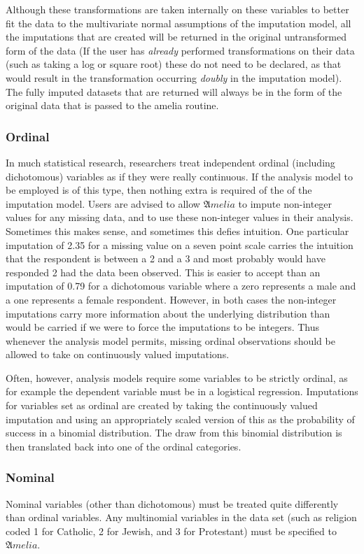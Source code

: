 \documentclass[12pt,titlepage]{article}
\begin{document}
Although these transformations are taken internally on these variables
to better fit the data to the multivariate normal assumptions of the
imputation model, all the imputations that are created will be
returned in the original untransformed form of the data (If the user has \emph{already} performed transformations on their data (such as taking a log or square root) these do not need to be declared, as that would result in the transformation occurring \emph{doubly} in the imputation model).  The fully
imputed datasets that are returned will always be in the form of the
original data that is passed to the amelia routine.

\subsubsection{Ordinal}
\label{sec:ord}
In much statistical research, researchers treat independent ordinal
(including dichotomous) variables as if they were really continuous.
If the analysis model to be employed is of this type, then nothing
extra is required of the of the imputation model. Users are advised to
allow ${\mathfrak Amelia}$ to impute non-integer values for any
missing data, and to use these non-integer values in their analysis.
Sometimes this makes sense, and sometimes this defies intuition. One
particular imputation of 2.35 for a missing value on a seven point
scale carries the intuition that the respondent is between a 2 and a 3
and most probably would have responded 2 had the data been observed.
This is easier to accept than an imputation of 0.79 for a dichotomous
variable where a zero represents a male and a one represents a female
respondent. However, in both cases the non-integer imputations carry
more information about the underlying distribution than would be
carried if we were to force the imputations to be integers. Thus
whenever the analysis model permits, missing ordinal observations
should be allowed to take on continuously valued imputations.

Often, however, analysis models require some variables to be strictly
ordinal, as for example the dependent variable must be in a logistical
regression.  Imputations for variables set as ordinal are created by
taking the continuously valued imputation and using an appropriately
scaled version of this as the probability of success in a binomial
distribution. The draw from this binomial distribution is then
translated back into one of the ordinal categories.

\subsubsection{Nominal}
\label{sec:nom}
Nominal variables (other than dichotomous) must be treated quite
differently than ordinal variables. Any multinomial variables in the
data set (such as religion coded 1 for Catholic, 2 for Jewish, and 3
for Protestant) must be specified to ${\mathfrak Amelia}$.
\end{document}
